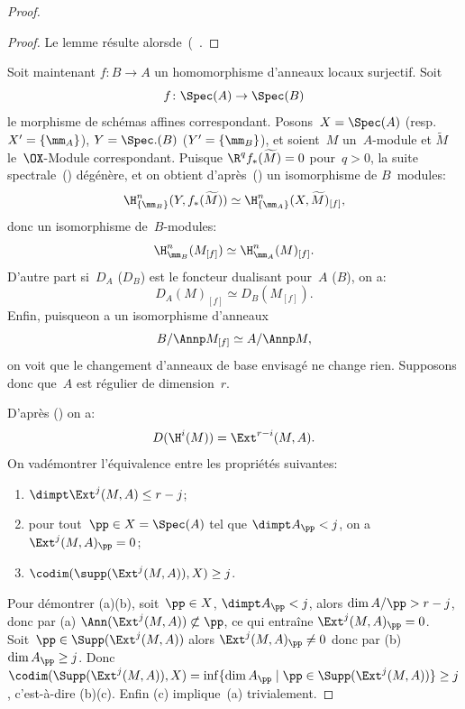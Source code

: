 \begin{proof}
\begin{proof}
Le lemme r\'esulte alors\pageoriginale de~(~.
\end{proof}

Soit maintenant $f\colon B\to A$ un homomorphisme d'anneaux locaux surjectif. Soit
$$f\colon\Spec(A)\to\Spec(B)$$
le morphisme de sch\'emas affines correspondant. Posons~$X=\Spec(A)$ (resp.\ $X^{\prime}=\{\mm_{A}\}$), $Y=\Spec.(B)$ (\resp $Y^{\prime}=\{\mm_{B}\}$), et soient~$M$ un~$A$-module et $\widetilde{M}$ le~$\OX$-Module correspondant. Puisque $\R^{q}f_{\ast}(\widetilde{M})=0$ pour~$q>0$, la suite spectrale~() d\'eg\'en\`ere, et on obtient d'apr\`es~() un isomorphisme de $B$~modules:
\begin{equation} \label{eq:V.18} \H_{\{\mm_{B}\} }^{n}(Y, f_{\ast}(\widetilde{M}))\simeq\H_{\{\mm_{A}\} }^{n}(X, \widetilde{M})_{[f]},
\end{equation}
donc un isomorphisme de~$B$-modules:
\begin{equation} \label{eq:V.19} \H_{\mm_{B}}^{n}(M_{[f]})\simeq\H_{\mm_{A}}^{n}(M)_{[f]}.
\end{equation}
D'autre part si~$D_{A}$ (\resp $D_{B}$) est le foncteur dualisant pour~$A$ (\resp $B$), on a:
\begin{equation} \label{eq:V.20} D_{A}(M)_{[f]}\simeq D_{B}(M_{[f]}).
\end{equation}
Enfin, puisqueon a un isomorphisme d'anneaux
\begin{equation} \label{eq:V.21} B/\Annp M_{[f]}\simeq A/\Annp M,
\end{equation}
on voit que le changement d'anneaux de base envisag\'e ne change rien. Supposons donc que~$A$ est r\'egulier de dimension~$r$.

D'apr\`es () on a:
\begin{equation} \label{eq:V.22}
D(\H^{i}(M))=\Ext^{r-i}(M, A).
\end{equation}
On va\pageoriginale d\'emontrer l'\'equivalence entre les propri\'et\'es suivantes:
\begin{enumerate}
\item[(a)] $\dimpt \Ext^{j}(M, A)\leq r-j$;
\item[(b)] pour tout~$\pp\in X=\Spec(A)$ tel que $\dimpt A_{\pp}<j$, on a~$\Ext^{j}(M, A)_{\pp}=0$;
\item[(c)] $\codim(\supp(\Ext^{j}(M, A)), X)\geq j$.
\end{enumerate}

Pour d\'emontrer (a)\ALORS (b), soit~$\pp\in X$, $\dimpt A_\pp<j$, alors $\dim A/\pp>r-j$, donc par (a) $\Ann(\Ext^{j}(M, A))\not\subset\pp$, ce qui entra\^ine $\Ext^{j}(M, A)_{\pp}=0$. Soit~$\pp\in\Supp(\Ext^{j}(M, A))$ alors $\Ext^{j}(M, A)_{\pp}\neq 0$ donc par (b) $\dim A_\pp\geq j$. Donc $\codim(\Supp(\Ext^{j}(M, A)), X)=\inf\{ \dim A_\pp\mid \pp\in\Supp(\Ext^{j}(M, A))\} \geq j$, c'est-\`a-dire (b)\ALORS (c). Enfin (c) implique~(a) trivialement.


\end{proof}
